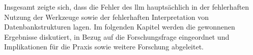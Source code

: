 Insgesamt zeigte sich, dass die Fehler des \gls{llm} hauptsächlich in der fehlerhaften Nutzung der Werkzeuge sowie der fehlerhaften Interpretation von Datenbankstrukturen lagen.
Im folgenden Kapitel werden die gewonnenen Ergebnisse diskutiert, in Bezug auf die Forschungsfrage eingeordnet und Implikationen für die Praxis sowie weitere Forschung abgeleitet.